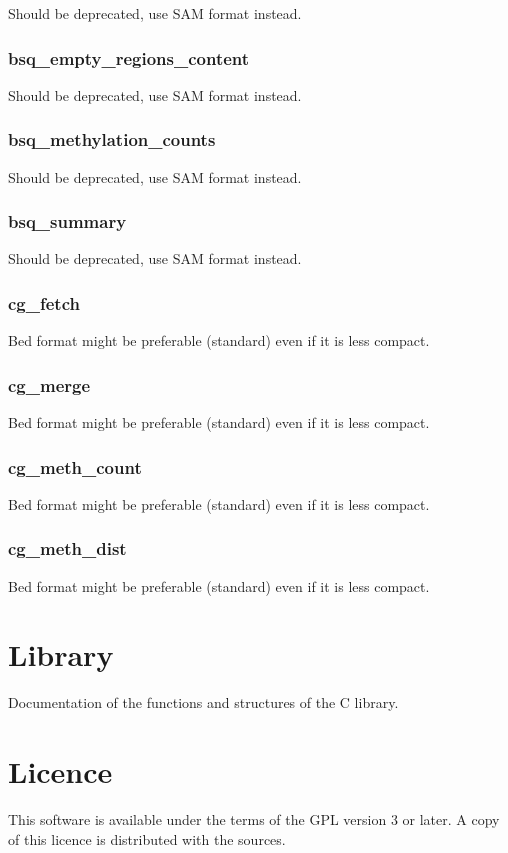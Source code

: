 \documentclass[a4paper,12pt]{article}
\begin{document}
Should be deprecated, use SAM format instead.

\subsubsection{bsq\_empty\_regions\_content}

Should be deprecated, use SAM format instead.

\subsubsection{bsq\_methylation\_counts}

Should be deprecated, use SAM format instead.

\subsubsection{bsq\_summary}

Should be deprecated, use SAM format instead.

\subsubsection{cg\_fetch}

Bed format might be preferable (standard) even if it is less compact.

\subsubsection{cg\_merge}

Bed format might be preferable (standard) even if it is less compact.

\subsubsection{cg\_meth\_count}

Bed format might be preferable (standard) even if it is less compact.

\subsubsection{cg\_meth\_dist}

Bed format might be preferable (standard) even if it is less compact.

\section{Library}

Documentation of the functions and structures of the C library.

\section{Licence}

This software is available under the terms of the GPL version 3 or later.
A copy of this licence is distributed with the sources.
\end{document}
